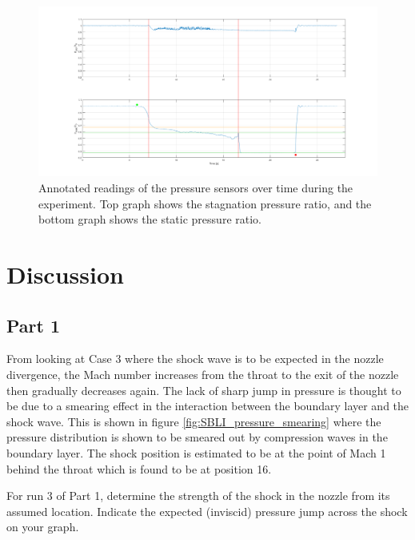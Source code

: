 \documentclass{article}
\begin{document}
\begin{figure}[H]
    \centering
    \includegraphics[width=1\textwidth]{../Supersonic_Nozzle/tunnel_pressures_annotated.png}
    \caption{Annotated readings of the pressure sensors over time during the experiment. Top graph shows the stagnation pressure ratio, and the bottom graph shows the static pressure ratio.}
    \label{fig:figure8}
\end{figure}

\section{Discussion}

\subsection{Part 1}

From looking at Case 3 where the shock wave is to be expected in the nozzle divergence, the Mach number increases from the throat to the exit of the nozzle then gradually decreases again.
The lack of sharp jump in pressure is thought to be due to a smearing effect in the interaction between the boundary layer and the shock wave.
This is shown in figure \ref{fig:SBLI_pressure_smearing} where the pressure distribution is shown to be smeared out by compression waves in the boundary layer.
The shock position is estimated to be at the point of Mach 1 behind the throat which is found to be at position 16.

For run 3 of Part 1, determine the strength of the shock in the nozzle from its assumed location.
Indicate the expected (inviscid) pressure jump across the shock on your graph.

\end{document}
